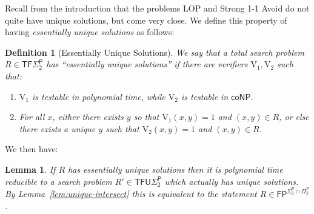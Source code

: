 \documentclass[11pt]{article}
\newtheorem{lemma}{Lemma}
\newtheorem{definition}{Definition}
\begin{document}
Recall from the introduction that the problems LOP and Strong 1-1 Avoid do not quite have unique solutions, but come very close. We define this property of having \emph{essentially unique solutions} as follows:
\begin{definition}[Essentially Unique Solutions]
We say that a total search problem $R \in \mathsf{TF\Sigma_2^P}$ has ``essentially unique solutions'' if there are verifiers $\mathrm{V_1}, \mathrm{V_2}$ such that:
\begin{enumerate}
    \item $\mathrm{V}_1$ is testable in polynomial time, while $\mathrm{V_2}$ is testable in $\mathsf{coNP}$.
    \item For all $x$, either there exists $y$ so that $\mathrm{V}_1(x,y)=1$ and $(x,y) \in R$, or else there exists a unique $y$ such that $\mathrm{V}_2(x,y)=1$ and $(x,y) \in R$.
\end{enumerate}
\end{definition}
We then have:
\begin{lemma}\label{lem:unique-sol}
If $R$ has essentially unique solutions then it is polynomial time reducible to a search problem $R' \in \mathsf{TFU\Sigma_2^P}$ which actually has unique solutions. By Lemma~\ref{lem:unique-intersect} this is equivalent to the statement $R \in \mathsf{FP^{\Sigma_2^P\cap \Pi_2^P}}$.
\end{lemma}
\end{document}
